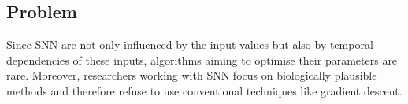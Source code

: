 \subsection{Problem}
\label{subsec:problem}

Since \acs{SNN} are not only influenced by the input values but also by temporal dependencies of these inputs, algorithms aiming to optimise their parameters are rare.
Moreover, researchers working with \acs{SNN} focus on biologically plausible methods and therefore refuse to use conventional techniques like gradient descent.